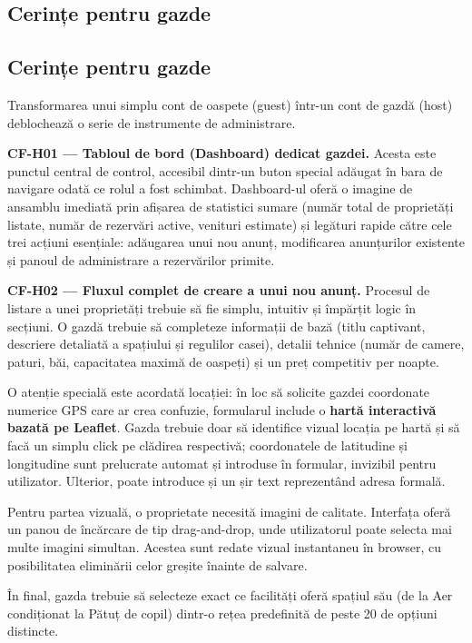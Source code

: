 \documentclass[12pt,a4paper,oneside]{report}
\begin{document}
\subsection{Cerințe pentru gazde}

\subsection{Cerințe pentru gazde}

Transformarea unui simplu cont de oaspete (guest) într-un cont de gazdă (host) deblochează o serie de instrumente de administrare.

\textbf{CF-H01 — Tabloul de bord (Dashboard) dedicat gazdei.} Acesta este punctul central de control, accesibil dintr-un buton special adăugat în bara de navigare odată ce rolul a fost schimbat. Dashboard-ul oferă o imagine de ansamblu imediată prin afișarea de statistici sumare (număr total de proprietăți listate, număr de rezervări active, venituri estimate) și legături rapide către cele trei acțiuni esențiale: adăugarea unui nou anunț, modificarea anunțurilor existente și panoul de administrare a rezervărilor primite.

\textbf{CF-H02 — Fluxul complet de creare a unui nou anunț.} Procesul de listare a unei proprietăți trebuie să fie simplu, intuitiv și împărțit logic în secțiuni. O gazdă trebuie să completeze informații de bază (titlu captivant, descriere detaliată a spațiului și regulilor casei), detalii tehnice (număr de camere, paturi, băi, capacitatea maximă de oaspeți) și un preț competitiv per noapte. 

O atenție specială este acordată locației: în loc să solicite gazdei coordonate numerice GPS care ar crea confuzie, formularul include o \textbf{hartă interactivă bazată pe Leaflet}. Gazda trebuie doar să identifice vizual locația pe hartă și să facă un simplu click pe clădirea respectivă; coordonatele de latitudine și longitudine sunt prelucrate automat și introduse în formular, invizibil pentru utilizator. Ulterior, poate introduce și un șir text reprezentând adresa formală. 

Pentru partea vizuală, o proprietate necesită imagini de calitate. Interfața oferă un panou de încărcare de tip drag-and-drop, unde utilizatorul poate selecta mai multe imagini simultan. Acestea sunt redate vizual instantaneu în browser, cu posibilitatea eliminării celor greșite înainte de salvare. 

În final, gazda trebuie să selecteze exact ce facilități oferă spațiul său (de la Aer condiționat la Pătuț de copil) dintr-o rețea predefinită de peste 20 de opțiuni distincte.
\end{document}
